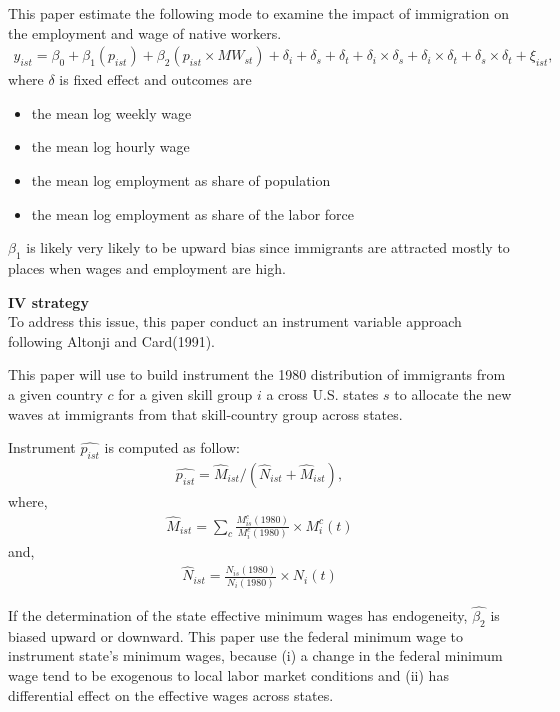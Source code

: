 \documentclass[../root]{subfiles}
\begin{document}
    This paper estimate the following mode to examine the impact of immigration on the  employment and wage of native workers.
    \begin{align}
        y_{ist}=\beta_0+\beta_1(p_{ist})+\beta_2(p_{ist} \times MW_{st}) +\delta_i + \delta_s + \delta_t + \delta_i \times \delta_s +\delta_i \times \delta_t +\delta_s \times \delta_t +\xi_{ist}, 
    \end{align} 
    where $\delta$ is fixed effect and outcomes are
    \begin{itemize}
        \item the mean log weekly wage
        \item the mean log hourly wage
        \item the mean log employment as share of population
        \item the mean log employment as share of the labor force
    \end{itemize}

    $\beta_1$ is likely very likely to be upward bias since immigrants are attracted mostly to places when wages and employment are high.
    
    {\bf IV strategy} \\
    To address this issue, this paper conduct an instrument variable approach following Altonji and Card(1991).

    This paper will use to build instrument the 1980 distribution of immigrants from a given country $c$ for a given skill group $i$ a cross U.S. states $s$ to allocate the new waves at immigrants from that skill-country group across states.
    
    Instrument $\hat{p_{ist}}$ is computed as follow:
    \begin{align}
        \hat{p_{ist}} =\hat{M}_{ist}/ (\hat{N}_{ist} +\hat{M}_{ist}),
    \end{align}
    where, 
    \begin{align}
        \hat{M}_{ist}=\sum_c\frac{M^c_{is}(1980)}{M^c_i(1980)} \times M^c_{i}(t)
    \end{align}
    and,
    \begin{align}
        \hat{N}_{ist}=\frac{N_{is}(1980)}{N_i(1980)} \times N_i(t)
    \end{align}

    If the determination of the state effective minimum wages has endogeneity, $\hat{\beta_2}$ is biased upward or downward.
    This paper use the federal minimum wage to instrument state's minimum wages, because (i) a change in the  federal minimum wage tend to be exogenous to local labor market conditions and (ii)  has differential effect on the effective wages across states. \\
\end{document}

